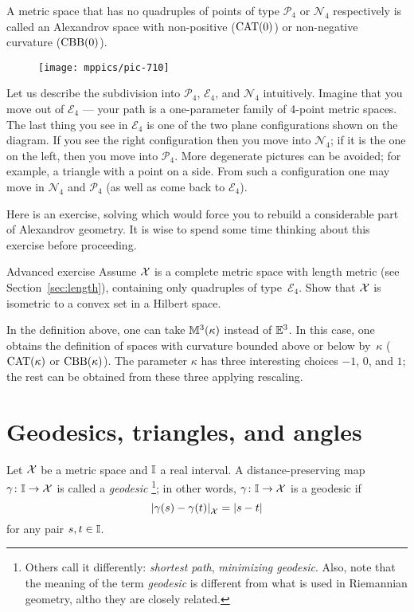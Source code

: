 A metric space that has no quadruples of points of type $\mathcal{P}_4$ or $\mathcal{N}_4$
respectively 
is called an Alexandrov space with non-positive ($\mathrm{CAT}(0)$) or non-negative curvature ($\mathrm{CBB}(0)$).

\begin{wrapfigure}{r}{33mm}
\vskip-0mm
\centering
\texttt{[image: mppics/pic-710]}
\end{wrapfigure}

Let us describe the subdivision into  $\mathcal{P}_4$, $\mathcal{E}_4$, and $\mathcal{N}_4$ intuitively.
Imagine that you move out of $\mathcal{E}_4$ --- your path is a one-parameter family of 4-point metric spaces.
The last thing you see in $\mathcal{E}_4$ is one of the two plane configurations shown on the diagram.
If you see the right configuration then you move into $\mathcal{N}_4$;
if it is the one on the left, then you move into $\mathcal{P}_4$.
More degenerate pictures can be avoided; for example, a triangle with a point on a side.
From such a configuration one may move in $\mathcal{N}_4$ and $\mathcal{P}_4$ (as well as come back to $\mathcal{E}_4$).

Here is an exercise, solving which would force you to rebuild a considerable part of Alexandrov geometry.
It is wise to spend some time thinking about this exercise before proceeding.

\begin{thm}{Advanced exercise}\label{ex:convex-set}
Assume $\mathcal{X}$ is a complete metric space with length metric (see Section~\ref{sec:length}), 
containing only quadruples of type~$\mathcal{E}_4$.
Show that $\mathcal{X}$ is isometric to a convex set in a Hilbert space.
\end{thm}

In the definition above, 
one can take $\mathbb{M}^3(\kappa)$
instead of $\mathbb{E}^3$.
In this case,
one obtains the definition of spaces with curvature bounded above or below by~$\kappa$ ($\mathrm{CAT}(\kappa)$ or $\mathrm{CBB}(\kappa)$).
The parameter $\kappa$ has three interesting choices $-1$, $0$, and $1$;
the rest can be obtained from these three applying rescaling.

\section{Geodesics, triangles, and angles}

Let $\mathcal{X}$ be a metric space 
and $\II$\index{$\II$} a real interval. 
A distance-preserving map $\gamma\colon\mathbb{I}\to \mathcal{X}$ is called a \emph{geodesic}%
\footnote{Others call it differently: \textit{shortest path}, \textit{minimizing geodesic}.
Also, note that the meaning of the term \textit{geodesic} is different from what is used in Riemannian geometry, altho they are closely related.}; 
in other words, $\gamma\colon\mathbb{I}\to \mathcal{X}$ is a geodesic if 
\[\dist{\gamma(s)}{\gamma(t)}{\spc{X}}=|s-t|\]
for any pair $s,t\in \mathbb{I}$.

